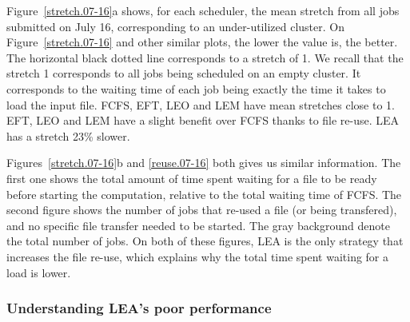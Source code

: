 \documentclass[conference,10pt]{IEEEtran}
\begin{document}
Figure~\ref{stretch.07-16}a shows, for each scheduler, the mean stretch from all jobs
submitted on July 16, corresponding to an under-utilized
cluster.
On Figure~\ref{stretch.07-16} and other similar plots, the lower the value is, the better.
The horizontal black dotted line corresponds to a stretch of 1.
We recall that the stretch 1 corresponds to all jobs being
scheduled on an empty cluster. It corresponds to the waiting time of each job being exactly
the time it takes to load the input file.
FCFS, EFT, LEO and LEM have mean stretches close to 1.
EFT, LEO and LEM have a slight benefit over FCFS thanks to file re-use.
LEA has a stretch 23\% slower.

Figures~\ref{stretch.07-16}b and \ref{reuse.07-16} 
both gives us similar information. The first one
shows the total amount of time spent 
waiting for a file to be ready before starting the computation,
relative to the total waiting time of FCFS.
The second figure
shows the number of jobs that re-used a file (or being transfered),
and no specific file transfer needed to be started.
The gray background denote the total
number of jobs.
On both of these figures, LEA is the only strategy that increases the
file re-use, which explains why the total time spent waiting for a load is lower.

\subsubsection{Understanding LEA's poor performance}
\end{document}

